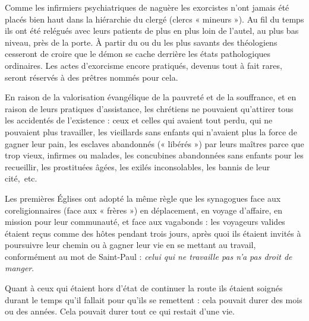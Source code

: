  Comme les infirmiers psychiatriques de naguère les exorcistes n'ont jamais été placés bien haut dans la hiérarchie du clergé (clercs « mineurs »). Au fil du temps ils ont été relégués avec leurs patients de plus en plus loin de l'autel, au plus bas niveau, près de la porte. À partir du  ou du  les plus savants des théologiens cesseront de croire que le démon se cache derrière les états pathologiques ordinaires. Les actes d'exorcisme encore pratiqués, devenus tout à fait rares, seront réservés à des prêtres nommés pour cela. 



En raison de la valorisation évangélique de la pauvreté et de la souffrance, et en raison de leurs pratiques d'assistance, les chrétiens ne pouvaient qu'attirer tous les accidentés de l'existence : ceux et celles qui avaient tout perdu, qui ne pouvaient plus travailler, les vieillards sans enfants qui n'avaient plus la force de gagner leur pain, les esclaves abandonnés (« libérés ») par leurs maîtres parce que trop vieux, infirmes ou malades, les concubines abandonnées sans enfants pour les recueillir, les prostituées âgées, les exilés inconsolables, les bannis de leur cité,~etc. 

 Les premières Églises ont adopté la même règle que les synagogues face aux coreligionnaires (face aux « frères ») en déplacement, en voyage d'affaire, en mission pour leur communauté, et face aux vagabonds : les voyageurs valides étaient reçus comme des hôtes pendant trois jours, après quoi ils étaient invités à poursuivre leur chemin ou à gagner leur vie en se mettant au travail, conformément au mot de Saint-Paul : \emph{celui qui ne travaille pas n'a pas droit de manger}. 

 Quant à ceux qui étaient hors d'état de continuer la route ils étaient soignés durant le temps qu'il fallait pour qu'ils se remettent : cela pouvait durer des mois ou des années. Cela pouvait durer tout ce qui restait d'une vie.



